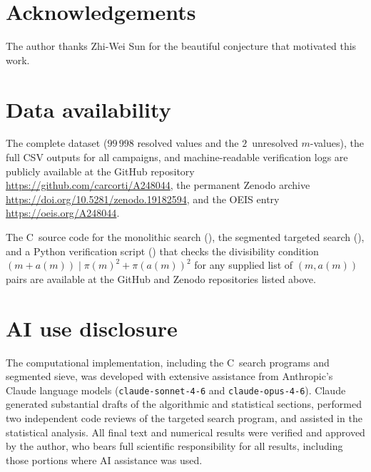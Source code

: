 \documentclass[11pt]{article}
\theoremstyle{definition}
\theoremstyle{remark}
\numberwithin{equation}{section}
\begin{document}
\section*{Acknowledgements}

The author thanks Zhi-Wei Sun for the beautiful conjecture that
motivated this work.

\section*{Data availability}
\label{sec:data}

The complete dataset ($99\,998$ resolved values and the
$2$~unresolved $m$-values), the full CSV outputs for all
campaigns, and machine-readable verification logs are publicly
available at the GitHub repository
\url{https://github.com/carcorti/A248044}, the permanent Zenodo archive
\url{https://doi.org/10.5281/zenodo.19182594}, and the OEIS entry
\url{https://oeis.org/A248044}.

The C~source code for the monolithic search
(), the segmented targeted search
(), and a Python verification script
() that checks the divisibility condition
$(m+a(m)) \mid \pi(m)^2 + \pi(a(m))^2$ for any supplied list
of $(m, a(m))$ pairs are available at the GitHub and Zenodo
repositories listed above.

\section*{AI use disclosure}
\label{sec:ai-disclosure}

The computational implementation, including the C~search programs
and segmented sieve, was developed with extensive assistance
from Anthropic's Claude language models
(\texttt{claude-sonnet-4-6} and \texttt{claude-opus-4-6}).
Claude generated substantial drafts of the algorithmic and
statistical sections, performed two independent code reviews
of the targeted search program, and assisted in the statistical
analysis.
All final text and numerical results were verified and approved by
the author, who bears full scientific responsibility for all results,
including those portions where AI assistance was used.
\end{document}
